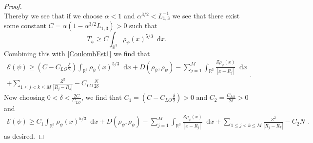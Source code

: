 \documentclass[a4paper,11pt]{article}
\newcommand{\abs}[1]{\left\lvert #1 \right\rvert}
\newcommand*\diff{\mathop{}\!\mathrm{d}}
\newcommand{\R}{\mathbb{R}}
\numberwithin{equation}{section}
\begin{document}
\begin{proof}
\begin{equation}
	\end{equation}
	Thereby we see that if we choose $ \alpha<1 $ and $ \alpha^{3/2}<L_{1,3}^{-1} $ we see that there exist some constant $C=\alpha(1-\alpha^{3/2}L_{1,3})>0  $ such that \begin{equation}
	T_\psi\geq C\int_{\R^3}\rho_\psi(x)^{5/3}\diff x.
	\end{equation}
	Combining this with \eqref{CoulombEst1} we find that \begin{equation}
	\begin{aligned}
	\mathcal{E}(\psi)\geq \left(C-C_{LO}\frac{\delta}{2}\right)\int_{\R^3}\rho_\psi(x)^{5/3}\diff x+D(\rho_\psi,\rho_\psi)-\sum_{j=1}^{M}\int_{\R^3}\frac{Z\rho_\psi(x)}{\abs{x-R_j}}\diff x\\+\sum_{1\leq j< k\leq M}\frac{Z^2}{\abs{R_j-R_k}}-C_{LO}\frac{N}{2\delta}
	\end{aligned}.
	\end{equation}
	Now choosing $ 0<\delta<\frac{2C}{C_{LO}} $, we find that $ C_1=\left(C-C_{LO}\frac{\delta}{2}\right)>0 $ and $ C_2=\frac{C_{LO}}{2\delta}>0 $ and 
	\begin{equation}
	\begin{aligned}
	\mathcal{E}(\psi)\geq C_1\int_{\R^3}\rho_\psi(x)^{5/3}\diff x+D(\rho_\psi,\rho_\psi)-\sum_{j=1}^{M}\int_{\R^3}\frac{Z\rho_\psi(x)}{\abs{x-R_j}}\diff x+\sum_{1\leq j< k\leq M}\frac{Z^2}{\abs{R_j-R_k}}-C_2N
	\end{aligned}.
	\end{equation}
	as desired.
\end{proof}
\end{document}
